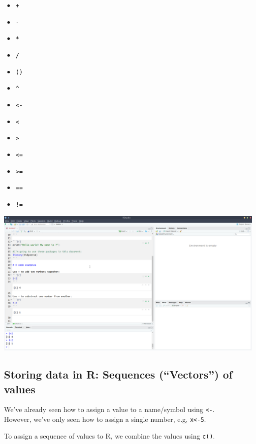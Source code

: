 \documentclass[]{book}
\providecommand{\tightlist}{%
  \setlength{\itemsep}{0pt}\setlength{\parskip}{0pt}}
\begin{document}
\begin{itemize}
\tightlist
\item
  \texttt{+}
\item
  \texttt{-}
\item
  \texttt{*}
\item
  \texttt{/}
\item
  \texttt{()}
\item
  \texttt{\^{}}
\item
  \texttt{\textless{}-}
\item
  \texttt{\textless{}}
\item
  \texttt{\textgreater{}}
\item
  \texttt{\textless{}=}
\item
  \texttt{\textgreater{}=}
\item
  \texttt{==}
\item
  \texttt{!=}
\end{itemize}

\includegraphics{images/installing_intro/ss_examples.png}

\hypertarget{storing-data-in-r-sequences-vectors-of-values}{%
\subsection*{Storing data in R: Sequences (``Vectors'') of values}\label{storing-data-in-r-sequences-vectors-of-values}}

We've already seen how to assign a value to a name/symbol using \texttt{\textless{}-}.\\
However, we've only seen how to assign a single number, e.g, \texttt{x\textless{}-5}.

To assign a sequence of values to R, we combine the values using \texttt{c()}.
\end{document}
